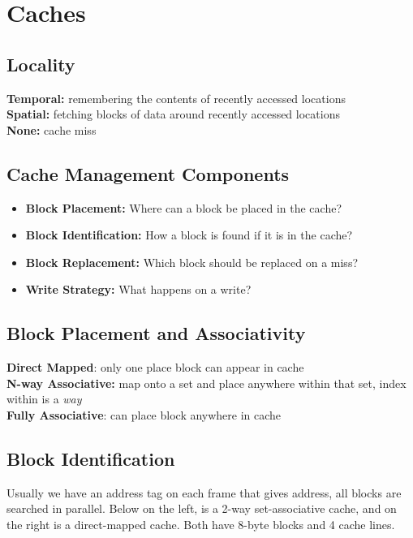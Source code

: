 \documentclass{article}
\begin{document}
\section{Caches}

\subsection{Locality}

\textbf{Temporal:} remembering the contents of recently accessed locations \\
\textbf{Spatial:} fetching blocks of data around recently accessed locations \\
\textbf{None:} cache miss

\subsection{Cache Management Components}

\begin{itemize}
\item \textbf{Block Placement:} Where can a block be placed in the cache?
\item \textbf{Block Identification:} How a block is found if it is in the cache?
\item \textbf{Block Replacement:} Which block should be replaced on a miss?
\item \textbf{Write Strategy:} What happens on a write?
\end{itemize}

\subsection{Block Placement and Associativity}
\textbf{Direct Mapped}: only one place block can appear in cache \\
\textbf{N-way Associative:} map onto a set and place anywhere within that set, index within is a \textit{way} \\
\textbf{Fully Associative}: can place block anywhere in cache

\subsection{Block Identification}
Usually we have an address tag on each frame that gives address, all blocks are searched in parallel. Below on the left, is a 2-way set-associative cache, and on the right is a direct-mapped cache. Both have 8-byte blocks and 4 cache lines.
\end{document}
